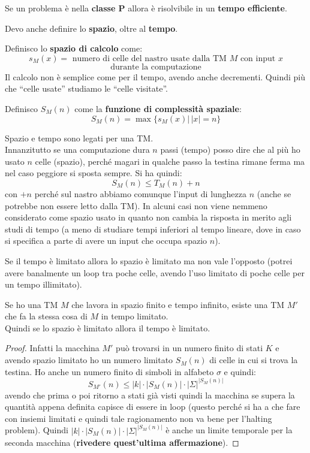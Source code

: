 \documentclass[a4paper,12pt, oneside]{book}
\begin{document}
\begin{teorema}
  Se un problema è nella \textbf{classe P} allora è risolvibile in un
  \textbf{tempo efficiente}.
\end{teorema}
Devo anche definire lo \textbf{spazio}, oltre al \textbf{tempo}.\\
\begin{definizione}
  Definisco lo \textbf{spazio di calcolo} come:
  \[s_M(x)=\mbox{ numero di celle del nastro usate dalla TM $M$ con input $x$}\]
  \[\mbox{durante la computazione}\]
  Il calcolo non è semplice come per il tempo, avendo anche decrementi. Quindi
  più che ``celle usate'' studiamo le ``celle visitate''.
\end{definizione}
\begin{definizione}
  Definisco $S_M(n)$ come la \textbf{funzione di complessità spaziale}:
  \[S_M(n)=\max\{s_M(x)|\,|x|=n\}\]
\end{definizione}
Spazio e tempo sono legati per una TM.\\
Innanzitutto se una computazione dura $n$ passi (tempo) posso dire che al più ho
usato $n$ celle (spazio), perché magari in qualche passo la testina rimane ferma
ma nel caso peggiore si sposta sempre. Si ha quindi:
\[S_M(n)\leq T_M(n)+n\]
con $+n$ perché sul nastro abbiamo comunque l'input di lunghezza $n$ (anche se
potrebbe non essere letto dalla TM). In alcuni casi non viene nemmeno
considerato come spazio usato in quanto non cambia la risposta in merito agli
studi di tempo (a meno di studiare tempi inferiori al tempo lineare, dove in
caso si specifica a parte di avere un input che occupa spazio $n$).
\begin{teorema}
  Se il tempo è limitato allora lo spazio è limitato ma non vale l'opposto
  (potrei avere banalmente un loop tra poche celle, avendo l'uso limitato di
  poche celle per un tempo illimitato).
\end{teorema}
\begin{teorema}
  Se ho una TM $M$ che lavora in spazio finito e tempo infinito, esiste una TM
  $M'$ che fa la stessa cosa di $M$ in tempo limitato.\\
  Quindi se lo spazio è limitato allora il tempo è limitato.
\end{teorema}
\begin{proof}
  Infatti la macchina $M'$ può trovarsi in un numero finito di stati $K$ e
  avendo spazio limitato ho un numero limitato $S_M(n)$ di celle in cui si trova
  la testina. Ho anche un numero finito di simboli in alfabeto $\sigma$ e
  quindi: 
  \[S_{M'}(n)\leq|k|\cdot |S_M(n)|\cdot |\Sigma|^{|S_M(n)|}\]
  avendo che prima o poi ritorno a stati già visti quindi la macchina se supera
  la quantità appena definita capisce di essere in loop (questo perché si ha a
  che fare con insiemi limitati e quindi tale ragionamento non va bene per
  l'halting problem). Quindi $|k|\cdot |S_M(n)|\cdot |\Sigma|^{|S_M(n)|}$ è
  anche un limite temporale per la seconda macchina (\textbf{rivedere
    quest'ultima affermazione}).
\end{proof}
\end{document}
